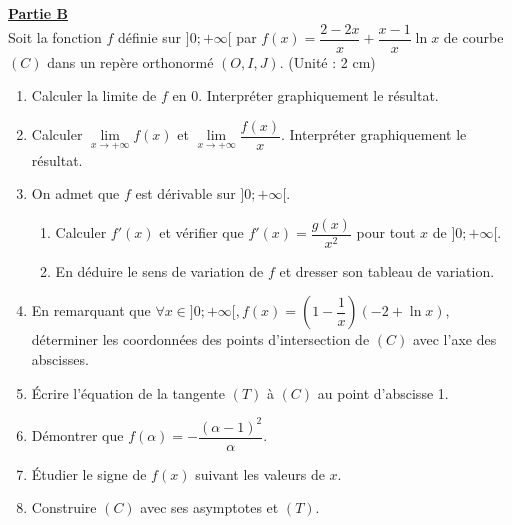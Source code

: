 \documentclass[12pt,a4paper]{article}
\begin{document}
\noindent \underline{\textbf{Partie B}} \\
Soit la fonction $f$ définie sur $]0; +\infty[$ par $f(x) = \dfrac{2-2x}{x} + \dfrac{x-1}{x}\ln x$ de courbe $(C)$ dans un repère orthonormé $(O, I, J)$. (Unité : 2 cm)
\begin{enumerate}
    \item Calculer la limite de $f$ en 0. Interpréter graphiquement le résultat.
    \item Calculer $\lim\limits_{x \to +\infty} f(x)$ et $\lim\limits_{x \to +\infty} \dfrac{f(x)}{x}$. Interpréter graphiquement le résultat.
    \item On admet que $f$ est dérivable sur $]0; +\infty[$.
    \begin{enumerate}
        \item Calculer $f'(x)$ et vérifier que $f'(x) = \dfrac{g(x)}{x^2}$ pour tout $x$ de $]0; +\infty[$.
        \item En déduire le sens de variation de $f$ et dresser son tableau de variation.
    \end{enumerate}
    \item En remarquant que $\forall x \in ]0; +\infty[, f(x) = \left(1 - \dfrac{1}{x}\right)(-2 + \ln x)$, déterminer les coordonnées des points d'intersection de $(C)$ avec l'axe des abscisses.
    \item Écrire l'équation de la tangente $(T)$ à $(C)$ au point d'abscisse 1.
    \item Démontrer que $f(\alpha) = -\dfrac{(\alpha-1)^2}{\alpha}$.
    \item Étudier le signe de $f(x)$ suivant les valeurs de $x$.
    \item Construire $(C)$ avec ses asymptotes et $(T)$.
\end{enumerate}

\vspace{0.5cm}
\end{document}

